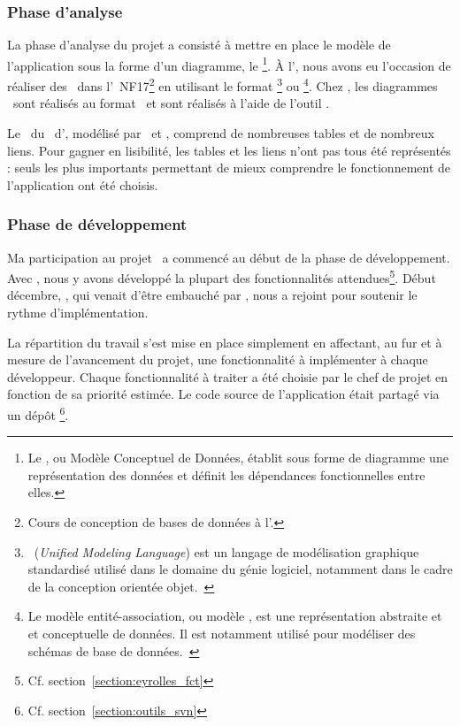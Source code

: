 \subsubsection{Phase d'analyse}

La phase d'analyse du projet a consisté à mettre en place le modèle de l'application sous la forme d'un diagramme, le \amcd\footnote{Le \amcd, ou Modèle Conceptuel de Données, établit sous forme de diagramme une représentation des données et définit les dépendances fonctionnelles entre elles.}. À l'\autc, nous avons eu l'occasion de réaliser des \amcds\ dans l'\auv\ NF17\footnote{Cours de conception de bases de données à l'\autc.} en utilisant le format \auml\footnote{\auml\ (\textit{Unified Modeling Language}) est un langage de modélisation graphique standardisé utilisé dans le domaine du génie logiciel, notamment dans le cadre de la conception orientée objet.~\cite{uml}} ou \aea\footnote{Le modèle entité-association, ou modèle \aea, est une représentation abstraite et et conceptuelle de données. Il est notamment utilisé pour modéliser des schémas de base de données.~\cite{ea}}. Chez \asl, les diagrammes \amcds\ sont réalisés au format \aea\ et sont réalisés à l'aide de l'outil \amysqlwb.

Le \amcd\ du \alotdeux\ d'\aey, modélisé par \acohen\ et \ahamon, comprend de nombreuses tables et de nombreux liens. Pour gagner en lisibilité, les tables et les liens n'ont pas tous été représentés : seuls les plus importants permettant de mieux comprendre le fonctionnement de l'application ont été choisis.


\subsubsection{Phase de développement}

Ma participation au projet \aey\ a commencé au début de la phase de développement. Avec \ahamon, nous y avons développé la plupart des fonctionnalités attendues\footnote{Cf. section~\ref{section:eyrolles_fct}}. Début décembre, \aweistroff, qui venait d'être embauché par \asl, nous a rejoint pour soutenir le rythme d'implémentation.

La répartition du travail s'est mise en place simplement en affectant, au fur et à mesure de l'avancement du projet, une fonctionnalité à implémenter à chaque développeur. Chaque fonctionnalité à traiter a été choisie par le chef de projet en fonction de sa priorité estimée. Le code source de l'application était partagé via un dépôt \asvn\footnote{Cf. section~\ref{section:outils_svn}}.

